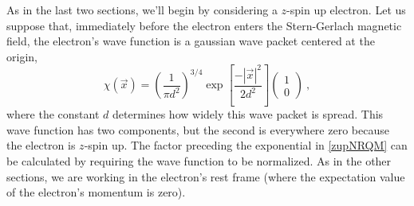 \documentclass[onecolumn,secnumarabic,amsmath,amssymb,balancelastpage,nofootinbib]{article}
\begin{document}
As in the last two sections, we'll begin by considering a $z$-spin up electron.  Let us suppose that, immediately before the electron enters the Stern-Gerlach magnetic field, the electron's wave function is a gaussian wave packet centered at the origin,
\begin{equation}
\chi(\vec{x}) = \left(\frac{1}{\pi d^2}\right)^{3/4}  \exp\left[\frac{-|\vec{x}|^2}{2 d^2}\right] \left(\begin{matrix} 1\\0 \end{matrix}\right)
\ ,
\label{zupNRQM}
\end{equation}
where the constant $d$ determines how widely this wave packet is spread.  This wave function has two components, but the second is everywhere zero because the electron is $z$-spin up.  The factor preceding the exponential in \eqref{zupNRQM} can be calculated by requiring the wave function to be normalized.  As in the other sections, we are working in the electron's rest frame (where the expectation value of the electron's momentum is zero).
\end{document}
